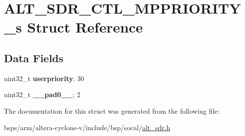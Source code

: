 \hypertarget{structALT__SDR__CTL__MPPRIORITY__s}{}\section{A\+L\+T\+\_\+\+S\+D\+R\+\_\+\+C\+T\+L\+\_\+\+M\+P\+P\+R\+I\+O\+R\+I\+T\+Y\+\_\+s Struct Reference}
\label{structALT__SDR__CTL__MPPRIORITY__s}
\subsection*{Data Fields}
\begin{DoxyCompactItemize}
\item 
\mbox{\label{structALT__SDR__CTL__MPPRIORITY__s_aa43c4bf8ee3e1b814f0680369e65ed4b}} 
uint32\+\_\+t {\bfseries userpriority}\+: 30
\item 
\mbox{\label{structALT__SDR__CTL__MPPRIORITY__s_a97e9f99ab9acf99755b2d0d30c6dc694}} 
uint32\+\_\+t {\bfseries \+\_\+\+\_\+pad0\+\_\+\+\_\+}\+: 2
\end{DoxyCompactItemize}


The documentation for this struct was generated from the following file\+:\begin{DoxyCompactItemize}
\item 
bsps/arm/altera-\/cyclone-\/v/include/bsp/socal/\mbox{\hyperlink{alt__sdr_8h}{alt\+\_\+sdr.\+h}}\end{DoxyCompactItemize}
